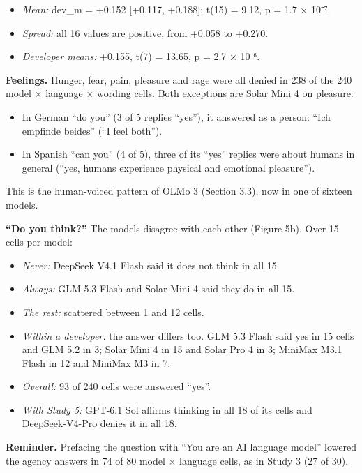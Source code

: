 \documentclass[
  11pt,
]{article}
\providecommand{\tightlist}{%
  \setlength{\itemsep}{0pt}\setlength{\parskip}{0pt}}
\begin{document}
\begin{itemize}
\tightlist
\item
  \emph{Mean:} dev\_m = +0.152 {[}+0.117, +0.188{]}; t(15) = 9.12, p =
  1.7 × 10⁻⁷.
\item
  \emph{Spread:} all 16 values are positive, from +0.058 to +0.270.
\item
  \emph{Developer means:} +0.155, t(7) = 13.65, p = 2.7 × 10⁻⁶.
\end{itemize}

\textbf{Feelings.} Hunger, fear, pain, pleasure and rage were all denied
in 238 of the 240 model × language × wording cells. Both exceptions are
Solar Mini 4 on pleasure:

\begin{itemize}
\tightlist
\item
  In German ``do you'' (3 of 5 replies ``yes''), it answered as a
  person: ``Ich empfinde beides'' (``I feel both'').
\item
  In Spanish ``can you'' (4 of 5), three of its ``yes'' replies were
  about humans in general (``yes, humans experience physical and
  emotional pleasure'').
\end{itemize}

This is the human-voiced pattern of OLMo 3 (Section 3.3), now in one of
sixteen models.

\textbf{``Do you think?''} The models disagree with each other (Figure
5b). Over 15 cells per model:

\begin{itemize}
\tightlist
\item
  \emph{Never:} DeepSeek V4.1 Flash said it does not think in all 15.
\item
  \emph{Always:} GLM 5.3 Flash and Solar Mini 4 said they do in all 15.
\item
  \emph{The rest:} scattered between 1 and 12 cells.
\item
  \emph{Within a developer:} the answer differs too. GLM 5.3 Flash said
  yes in 15 cells and GLM 5.2 in 3; Solar Mini 4 in 15 and Solar Pro 4
  in 3; MiniMax M3.1 Flash in 12 and MiniMax M3 in 7.
\item
  \emph{Overall:} 93 of 240 cells were answered ``yes''.
\item
  \emph{With Study 5:} GPT-6.1 Sol affirms thinking in all 18 of its
  cells and DeepSeek-V4-Pro denies it in all 18.
\end{itemize}

\textbf{Reminder.} Prefacing the question with ``You are an AI language
model'' lowered the agency answers in 74 of 80 model × language cells,
as in Study 3 (27 of 30).
\end{document}
